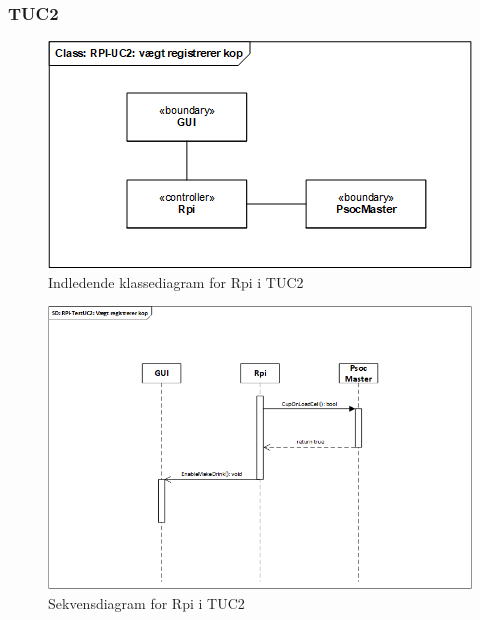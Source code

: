 \subsubsection{TUC2}

\begin{figure}[H]
    \centering
    \includegraphics[width=1\textwidth]{Images/Applikationsmodeller/rpi/rpi_klassediagramTestUC2.png}
    \caption{Indledende klassediagram for Rpi i TUC2}
    \label{fig:cdTUC2Rpi}
\end{figure}

\begin{figure}[H]
    \centering
    \includegraphics[width=1\textwidth]{Images/Applikationsmodeller/rpi/rpi_sekvensdiagramTestUC2.png}
    \caption{Sekvensdiagram for Rpi i TUC2}
    \label{fig:sdTUC2Rpi}
\end{figure}

